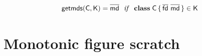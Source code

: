 \documentclass[a4paper,USenglish]{tex/lipics-v2016}
\begin{document}
\begin{equation*}
\getmds\C\K = \b\md ~~\mathit{if}~~ \Class\C{\b{\fd}}{\b\md} \in \K
\end{equation*}

\hrulefill

\begin{mathpar}
\end{mathpar}


\section{Monotonic figure scratch}








\end{document}
